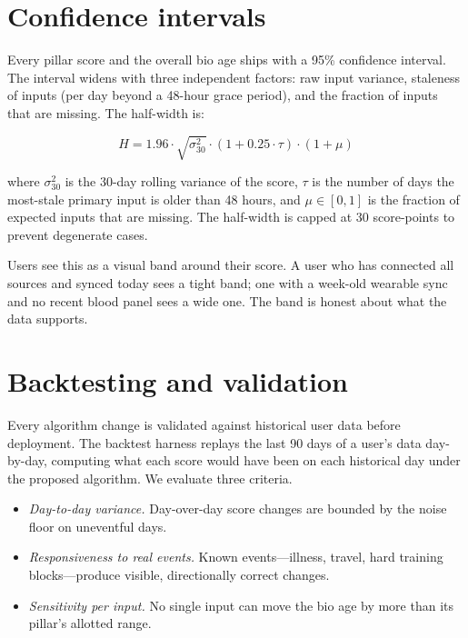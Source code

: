 \documentclass[10pt, a4paper]{article}
\begin{document}
\section{Confidence intervals}

Every pillar score and the overall bio age ships with a 95\% confidence interval. The interval widens with three independent factors: raw input variance, staleness of inputs (per day beyond a 48-hour grace period), and the fraction of inputs that are missing. The half-width is:

\begin{equation}
H = 1.96 \cdot \sqrt{\sigma^2_{30}} \cdot (1 + 0.25 \cdot \tau) \cdot (1 + \mu)
\label{eq:ci}
\end{equation}

where $\sigma^2_{30}$ is the 30-day rolling variance of the score, $\tau$ is the number of days the most-stale primary input is older than 48 hours, and $\mu \in [0,1]$ is the fraction of expected inputs that are missing. The half-width is capped at 30 score-points to prevent degenerate cases.

Users see this as a visual band around their score. A user who has connected all sources and synced today sees a tight band; one with a week-old wearable sync and no recent blood panel sees a wide one. The band is honest about what the data supports.

\section{Backtesting and validation}

Every algorithm change is validated against historical user data before deployment. The backtest harness replays the last 90 days of a user's data day-by-day, computing what each score would have been on each historical day under the proposed algorithm. We evaluate three criteria.

\begin{itemize}
  \item \textit{Day-to-day variance.} Day-over-day score changes are bounded by the noise floor on uneventful days.
  \item \textit{Responsiveness to real events.} Known events---illness, travel, hard training blocks---produce visible, directionally correct changes.
  \item \textit{Sensitivity per input.} No single input can move the bio age by more than its pillar's allotted range.
\end{itemize}
\end{document}
